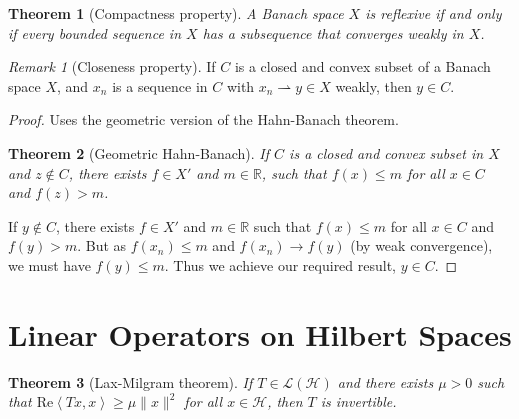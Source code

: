 \documentclass[10pt, oneside, reqno]{amsart}
\theoremstyle{plain}%
\newtheorem{thm}{Theorem}[section]
\numberwithin{equation}{section}
\theoremstyle{definition}
\theoremstyle{remark}
\newtheorem*{rem}{Remark}
\newcommand{\R}{\mathbb{R}}
\newcommand{\iprod}[1]{\left\langle #1 \right\rangle}
\renewcommand{\Re}{\text{Re}}
\begin{document}
\begin{thm}[Compactness property]
    A Banach space $X$ is reflexive if and only if every bounded sequence in $X$ has a subsequence that converges weakly in $X$.
\end{thm}

\begin{rem}[Closeness property]
    If $C$ is a closed and convex subset of a Banach space $X$, and $x_n$ is a sequence in $C$ with $x_n \rightharpoonup y \in X$ weakly, then $y \in C$.   
\end{rem}

\begin{proof}
    Uses the geometric version of the Hahn-Banach theorem. 
    
    \begin{thm}[Geometric Hahn-Banach]
        If $C$ is a closed and convex subset in $X$ and $z \notin C$, there exists $f \in X'$ and $m \in \R$, such that $f(x) \leq m$ for all $x \in C$ and $f(z) > m$. 
    \end{thm}
    
    If $y \notin C$, there exists $f \in X'$ and $m \in \R$ such that $f(x) \leq m$ for all $x \in C$ and $f(y) > m$.  But as $f(x_n) \leq m$ and $f(x_n) \rightarrow f(y)$ (by weak convergence), we must have $f(y) \leq m$.  Thus we achieve our required result, $y \in C$.  
\end{proof}


\section{Linear Operators on Hilbert Spaces} %
\label{sec:linear_operators_on_hilbert_spaces}

\begin{thm}[Lax-Milgram theorem]
    \label{thm:lax_milgram}
    If $T \in \mathcal L(\mathcal H)$ and there exists $\mu > 0$ such that $\Re \iprod{Tx, x} \geq \mu \| x \|^2$ for all $x \in \mathcal H$, then $T$ is invertible.  
\end{thm}
\end{document}
